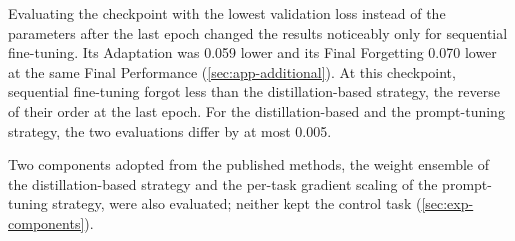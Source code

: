 Evaluating the checkpoint with the lowest validation loss instead of the parameters after the last epoch changed the results noticeably only for sequential fine-tuning.
Its Adaptation was 0.059 lower and its Final Forgetting 0.070 lower at the same Final Performance (\cref{sec:app-additional}).
At this checkpoint, sequential fine-tuning forgot less than the distillation-based strategy, the reverse of their order at the last epoch.
For the distillation-based and the prompt-tuning strategy, the two evaluations differ by at most 0.005.

Two components adopted from the published methods, the weight ensemble of the distillation-based strategy and the per-task gradient scaling of the prompt-tuning strategy, were also evaluated; neither kept the control task (\cref{sec:exp-components}).


